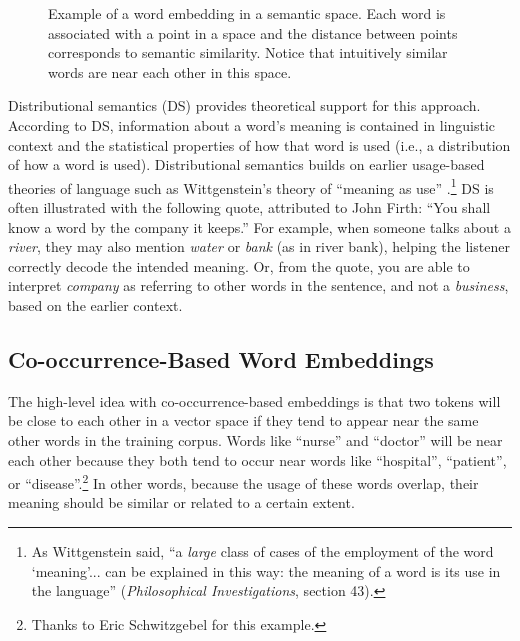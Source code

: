 \begin{figure}[h]
    \centering
    \caption[Adapted from an image generated using .]{Example of a word embedding in a semantic space. Each word is associated with a point in a space and the distance between points corresponds to semantic similarity. Notice that intuitively similar words are near each other in this space. }
 \label{f:writerPainterExample}
\end{figure}

Distributional semantics (DS) provides theoretical support for this approach. According to DS, information about a word's meaning is contained in linguistic context \cite{harris1954distributional, firth1957synopsis} and the statistical properties of how that word is used (i.e., a distribution of how a word is used). Distributional semantics builds on earlier usage-based theories of language such as Wittgenstein's theory of ``meaning as use'' \cite{wittgenstein1953philosophical}.\footnote{As Wittgenstein said, ``a \emph{large} class of cases of the employment of the word `meaning'... can be explained in this way: the meaning of a word is its use in the language'' (\emph{Philosophical Investigations}, section 43).} DS is often illustrated with the following quote, attributed to John Firth: ``You shall know a word by the company it keeps.'' For example, when someone talks about a \textit{river}, they may also mention \textit{water} or \textit{bank} (as in river bank), helping the listener correctly decode the intended meaning. Or, from the quote, you are able to interpret \textit{company} as referring to other words in the sentence, and not a \textit{business}, based on the earlier context.

\subsection{Co-occurrence-Based Word Embeddings}


The high-level idea with co-occurrence-based embeddings is that two tokens will be close to each other in a vector space if they tend to appear near the same other words in the training corpus. Words like ``nurse'' and ``doctor'' will be near each other because they both tend to occur near words like ``hospital'', ``patient'', or ``disease''.\footnote{Thanks to Eric Schwitzgebel for this example.} In other words, because the usage of these words overlap, their meaning should be similar or related to a certain extent.


